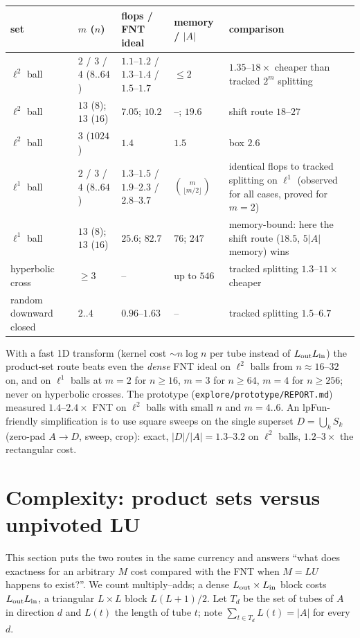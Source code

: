\documentclass[11pt]{article}
\begin{document}
\begin{center}\small
\begin{tabular}{@{}p{2.2cm}p{2.0cm}p{3.2cm}p{1.5cm}p{4.9cm}@{}}
\toprule
set & $m$ ($n$) & flops / FNT ideal & memory / $|A|$ & comparison \\
\midrule
$\ell^2$ ball & $2$ / $3$ / $4$ ($8..64$) & $1.1$--$1.2$ / $1.3$--$1.4$ / $1.5$--$1.7$ & $\le2$ & $1.35$--$18\times$ cheaper than tracked $2^m$ splitting\\
$\ell^2$ ball & $13$ ($8$); $13$ ($16$) & $7.05$; $10.2$ & --; $19.6$ & shift route $18$--$27$\\
$\ell^2$ ball & $3$ ($1024$) & $1.4$ & $1.5$ & box $2.6$\\
$\ell^1$ ball & $2$ / $3$ / $4$ ($8..64$) & $1.3$--$1.5$ / $1.9$--$2.3$ / $2.8$--$3.7$ & $\binom{m}{\lfloor m/2\rfloor}$ & identical flops to tracked splitting on $\ell^1$ (observed for all cases, proved for $m=2$)\\
$\ell^1$ ball & $13$ ($8$); $13$ ($16$) & $25.6$; $82.7$ & $76$; $247$ & memory-bound: here the shift route ($18.5$, $5|A|$ memory) wins\\
hyperbolic cross & $\ge3$ & -- & up to $546$ & tracked splitting $1.3$--$11\times$ cheaper\\
random downward closed & $2..4$ & $0.96$--$1.63$ & -- & tracked splitting $1.5$--$6.7$\\
\bottomrule
\end{tabular}
\end{center}
\normalsize
With a fast 1D transform (kernel cost $\sim n\log n$ per tube instead of $L_{\rm out}L_{\rm in}$) the product-set route
beats even the \emph{dense} FNT ideal on $\ell^2$ balls from $n\approx16$--$32$ on, and on $\ell^1$ balls at $m=2$ for
$n\ge16$, $m=3$ for $n\ge64$, $m=4$ for $n\ge256$; never on hyperbolic crosses. The prototype
(\texttt{explore/prototype/REPORT.md}) measured $1.4$--$2.4\times$ FNT on $\ell^2$ balls with small $n$ and $m=4..6$.
An lpFun-friendly simplification is to use square sweeps on the single superset $D=\bigcup_kS_k$ (zero-pad $A\to D$,
sweep, crop): exact, $|D|/|A|=1.3$--$3.2$ on $\ell^2$ balls, $1.2$--$3\times$ the rectangular cost.

\section{Complexity: product sets versus unpivoted LU}\label{sec:cmp}
This section puts the two routes in the same currency and answers ``what does exactness for an arbitrary $M$
cost compared with the FNT when $M=LU$ happens to exist?''. We count multiply--adds; a dense $L_{\rm out}\times L_{\rm in}$
block costs $L_{\rm out}L_{\rm in}$, a triangular $L\times L$ block $L(L+1)/2$. Let $T_d$ be the set of tubes of $A$ in
direction $d$ and $L(t)$ the length of tube $t$; note $\sum_{t\in T_d}L(t)=|A|$ for every $d$.
\end{document}
